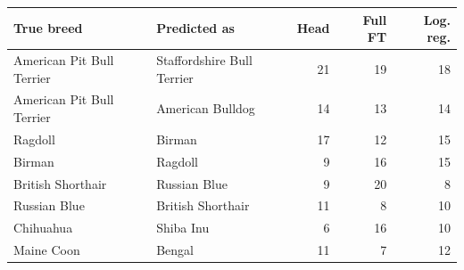 \begin{tabular}{llrrr}
\toprule
True breed & Predicted as & Head & Full FT & Log. reg. \\
\midrule
American Pit Bull Terrier & Staffordshire Bull Terrier & 21 & 19 & 18 \\
American Pit Bull Terrier & American Bulldog & 14 & 13 & 14 \\
Ragdoll & Birman & 17 & 12 & 15 \\
Birman & Ragdoll & 9 & 16 & 15 \\
British Shorthair & Russian Blue & 9 & 20 & 8 \\
Russian Blue & British Shorthair & 11 & 8 & 10 \\
Chihuahua & Shiba Inu & 6 & 16 & 10 \\
Maine Coon & Bengal & 11 & 7 & 12 \\
\bottomrule
\end{tabular}